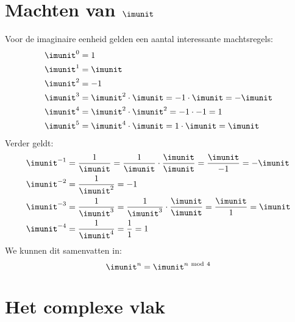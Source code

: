 \section{Machten van $\imunit$}
Voor de imaginaire eenheid gelden een aantal interessante machtsregels:
%
\begin{equation}
\begin{split}
\imunit^0 &= 1 \\
\imunit^1 &= \imunit \\
\imunit^2 &= -1 \\
\imunit^3 &= \imunit^2\cdot\imunit = -1\cdot\imunit = -\imunit\\
\imunit^4 &= \imunit^2\cdot\imunit^2 = -1\cdot-1 = 1 \\
\imunit^5 &= \imunit^4\cdot\imunit = 1\cdot\imunit = \imunit
\end{split}
\end{equation}
%
Verder geldt:
%
\begin{equation}
\begin{split}
\imunit^{-1} &= \dfrac{1}{\imunit} = \dfrac{1}{\imunit}\cdot\dfrac{\imunit}{\imunit} = \dfrac{\imunit}{-1} = -\imunit \\
\imunit^{-2} &= \dfrac{1}{\imunit^2} = -1 \\
\imunit^{-3} &= \dfrac{1}{\imunit^3} = \dfrac{1}{\imunit^3}\cdot\dfrac{\imunit}{\imunit} = \dfrac{\imunit}{1} = \imunit \\
\imunit^{-4} &= \dfrac{1}{\imunit^4} = \dfrac{1}{1} = 1
\end{split}
\end{equation}
%
We kunnen dit samenvatten in:
%
\begin{equation}
\imunit^n = \imunit^{n\ \mathrm{mod}\ 4}
\end{equation}


\section{Het complexe vlak}

